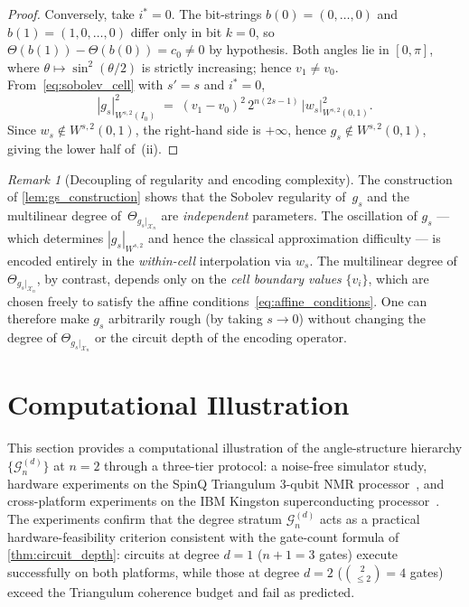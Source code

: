 \documentclass[12pt,a4paper]{article}
\theoremstyle{plain}
\theoremstyle{definition}
\theoremstyle{remark}
\newtheorem{remark}[remark]{Remark}
\newcommand{\Gclass}[2]{\mathcal{G}_{#1}^{(#2)}}
\begin{document}
\begin{proof}
Conversely, take $i^* = 0$. The bit-strings $b(0)=(0,\ldots,0)$ and
$b(1)=(1,0,\ldots,0)$ differ only in bit $k=0$, so
$\Theta(b(1))-\Theta(b(0)) = c_0\neq 0$ by hypothesis.
Both angles lie in $[0,\pi]$, where $\theta\mapsto\sin^2(\theta/2)$ is
strictly increasing; hence $v_1\neq v_0$.
From~\eqref{eq:sobolev_cell} with $s'=s$ and $i^*=0$,
\[
  |g_s|^2_{W^{s,2}(I_0)}
  \;=\; (v_1-v_0)^2\,2^{n(2s-1)}\,
        |w_s|^2_{W^{s,2}(0,1)}.
\]
Since $w_s \notin W^{s,2}(0,1)$, the right-hand side is $+\infty$,
hence $g_s \notin W^{s,2}(0,1)$, giving the lower half of~(ii).
\end{proof}

\begin{remark}[Decoupling of regularity and encoding complexity]
\label{rem:decoupling}
The construction of \cref{lem:gs_construction} shows that the Sobolev
regularity of~$g_s$ and the multilinear degree of~$\Theta_{g_s|_{\mathcal{X}_n}}$ are
\emph{independent} parameters.
The oscillation of $g_s$ — which determines $|g_s|_{W^{s,2}}$ and hence
the classical approximation difficulty — is encoded entirely in the
\emph{within-cell} interpolation via $w_s$.
The multilinear degree of $\Theta_{g_s|_{\mathcal{X}_n}}$, by contrast, depends only on the
\emph{cell boundary values} $\{v_i\}$, which are chosen freely to
satisfy the affine conditions~\eqref{eq:affine_conditions}.
One can therefore make $g_s$ arbitrarily rough (by taking $s\to 0$)
without changing the degree of $\Theta_{g_s|_{\mathcal{X}_n}}$ or the circuit depth of the
encoding operator.
\end{remark}

\section{Computational Illustration}
\label{sec:experiments}

This section provides a computational illustration of the
angle-structure hierarchy $\{\Gclass{n}{d}\}$ at $n=2$ through a
three-tier protocol: a noise-free simulator study, hardware experiments
on the SpinQ Triangulum 3-qubit NMR processor~\cite{SpinQ2021}, and
cross-platform experiments on the IBM Kingston superconducting
processor~\cite{IBMQuantum2024}.
The experiments confirm that the degree stratum $\Gclass{n}{d}$ acts
as a practical hardware-feasibility criterion consistent with the
gate-count formula of \cref{thm:circuit_depth}: circuits at degree
$d=1$ ($n+1=3$ gates) execute successfully on both platforms, while
those at degree $d=2$ ($\binom{2}{\leq 2}=4$ gates) exceed the
Triangulum coherence budget and fail as predicted.
\end{document}
